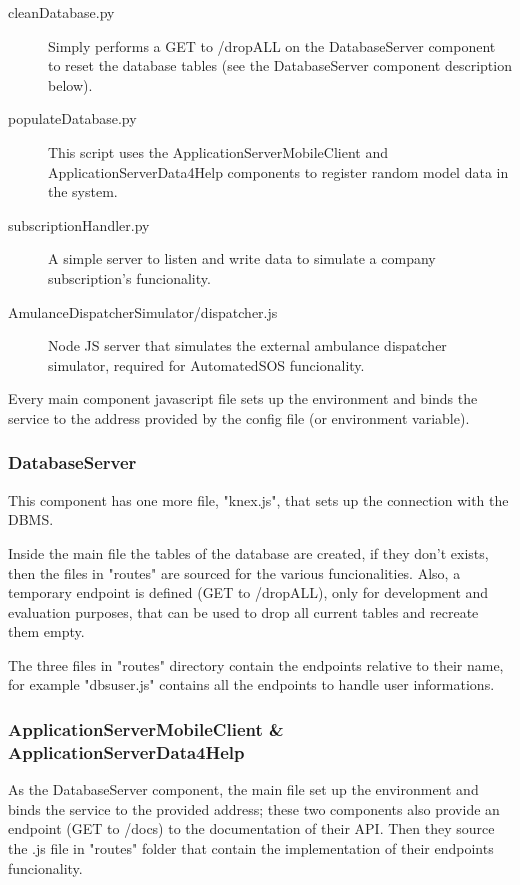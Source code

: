 \documentclass[../main.tex]{subfiles}
\begin{document}
\begin{description}
	\item[cleanDatabase.py] Simply performs a GET to /dropALL on the DatabaseServer component to reset the database tables (see the DatabaseServer component description below).
	\item[populateDatabase.py] This script uses the ApplicationServerMobileClient and ApplicationServerData4Help components to register random model data in the system.
	\item[subscriptionHandler.py] A simple server to listen and write data to simulate a company subscription's funcionality.
	\item[AmulanceDispatcherSimulator/dispatcher.js] Node JS server that simulates the external ambulance dispatcher simulator, required for AutomatedSOS funcionality.
\end{description}

Every main component javascript file sets up the environment and binds the service to the address provided by the config file (or environment variable).

\subsubsection{DatabaseServer}

This component has one more file, "knex.js", that sets up the connection with the DBMS.

Inside the main file the tables of the database are created, if they don't exists, then the files in "routes" are sourced for the various funcionalities. Also, a temporary endpoint is defined (GET to /dropALL), only for development and evaluation purposes, that can be used to drop all current tables and recreate them empty.

The three files in "routes" directory contain the endpoints relative to their name, for example "dbs\textunderscore user.js" contains all the endpoints to handle user informations.

\subsubsection{ApplicationServerMobileClient \& ApplicationServerData4Help}

As the DatabaseServer component, the main file set up the environment and binds the service to the provided address; these two components also provide an endpoint (GET to /docs) to the documentation of their API. Then they source the .js file in "routes" folder that contain the implementation of their endpoints funcionality.
\end{document}

